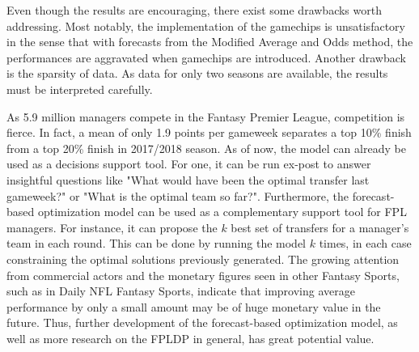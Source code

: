 \newpar

Even though the results are encouraging, there exist some drawbacks worth addressing. Most notably, the implementation of the gamechips is unsatisfactory in the sense that with forecasts from the Modified Average and Odds method, the performances are aggravated when gamechips are introduced. Another drawback is the sparsity of data. As data for only two seasons are available, the results must be interpreted carefully. 


\newpar

As 5.9 million managers compete in the Fantasy Premier League, competition is fierce. In fact, a mean of only 1.9 points per gameweek separates a top 10\% finish from a top 20\% finish in 2017/2018 season. As of now, the model can already be used as a decisions support tool. For one, it can be run ex-post to answer insightful questions like "What would have been the optimal transfer last gameweek?" or "What is the optimal team so far?". Furthermore, the forecast-based optimization model can be used as a complementary support tool for FPL managers. For instance, it can propose the $k$ best set of transfers for a manager's team in each round. This can be done by running the model $k$ times, in each case constraining the optimal solutions previously generated. The growing attention from commercial actors and the monetary figures seen in other Fantasy Sports, such as in Daily NFL Fantasy Sports, indicate that improving average performance by only a small amount may be of huge monetary value in the future. Thus, further development of the forecast-based optimization model, as well as more research on the FPLDP in general, has great potential value. 
